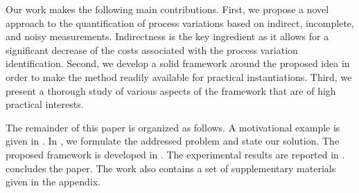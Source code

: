Our work makes the following main contributions. First, we propose a novel approach to the quantification of process variations based on indirect, incomplete, and noisy measurements. Indirectness is the key ingredient as it allows for a significant decrease of the costs associated with the process variation identification. Second, we develop a solid framework around the proposed idea in order to make the method readily available for practical instantiations. Third, we present a thorough study of various aspects of the framework that are of high practical interests.

The remainder of this paper is organized as follows. A motivational example is given in . In , we formulate the addressed problem and state our solution. The proposed framework is developed in . The experimental results are reported in .  concludes the paper. The work also contains a set of supplementary materials given in the appendix.
